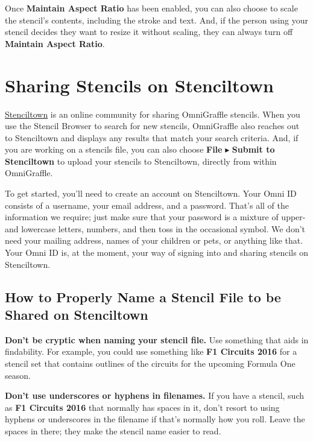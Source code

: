 \documentclass[../main.tex]{subfiles}
\begin{document}

Once \textbf{Maintain Aspect Ratio} has been enabled, you can also choose to scale the stencil's
contents, including the stroke and text. And, if the person using your stencil decides they
want to resize it without scaling, they can always turn off \textbf{Maintain Aspect Ratio}.

\section{Sharing Stencils on Stenciltown}

\href{https://stenciltown.omnigroup.com}{Stenciltown} is an online community for sharing
OmniGraffle stencils. When you use the Stencil Browser to search for new stencils, OmniGraffle
also reaches out to Stenciltown and displays any results that match your search criteria. And,
if you are working on a stencils file, you can also choose \textbf{File} $\blacktriangleright$
\textbf{Submit to Stenciltown} to upload your stencils to Stenciltown, directly from within
OmniGraffle.

To get started, you'll need to create an account on Stenciltown. Your Omni ID consists of a
username, your email address, and a password. That's all of the information we require; just
make sure that your password is a mixture of upper- and lowercase letters, numbers, and then
toss in the occasional symbol. We don't need your mailing address, names of your children or
pets, or anything like that. Your Omni ID is, at the moment, your way of signing into and
sharing stencils on Stenciltown.

\subsection{How to Properly Name a Stencil File to be Shared on Stenciltown}

\textbf{Don't be cryptic when naming your stencil file.} Use something that aids in findability.
For example, you could use something like \textbf{F1 Circuits 2016} for a stencil set that
contains outlines of the circuits for the upcoming Formula One season.

\textbf{Don't use underscores or hyphens in filenames.} If you have a stencil, such as
\textbf{F1 Circuits 2016} that normally has spaces in it, don't resort to using hyphens or
underscores in the filename if that's normally how you roll. Leave the spaces in there; they
make the stencil name easier to read.
\end{document}
